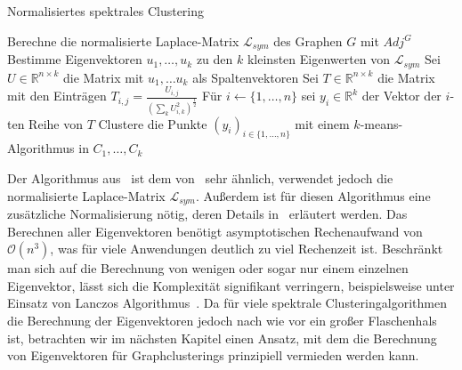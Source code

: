 \begin{algorithm}[H]
\label{algo:normalized-spectral-clustering-ng-jordan-weis}
\caption{Normalisiertes spektrales Clustering~\cite{NgJW01}}
	\DontPrintSemicolon
	
	\BlankLine
	
	Berechne die normalisierte Laplace-Matrix $\mathcal{L}_{sym}$ des Graphen $G$ mit $Adj^G$\;
	Bestimme Eigenvektoren $u_1, \dots, u_k$ zu den $k$ kleinsten Eigenwerten von $\mathcal{L}_{sym}$\;
	Sei $U \in \mathbb{R}^{n \times k}$ die Matrix mit $u_1, \dots u_k$ als Spaltenvektoren\;
	Sei $T \in \mathbb{R}^{n \times k}$ die Matrix mit den Einträgen
	$ T_{i,j} = \frac{U_{i,j}}{\left(\sum_k U_{i,k}^2\right)^{\frac{1}{2}}} $ \;
	Für $i \leftarrow \{ 1, \dots, n \}$ sei $y_i \in \mathbb{R}^k$ der Vektor der $i$-ten Reihe von $T$\;
	Clustere die Punkte $(y_i)_{i \in \{1, \dots, n\}}$ mit einem $k$-means-Algorithmus in $C_1, \dots, C_k$
\end{algorithm}
Der Algorithmus aus~\cite{NgJW01} ist dem von~\cite{ShiM00} sehr ähnlich, verwendet jedoch die normalisierte Laplace-Matrix
$\mathcal{L}_{sym}$. Außerdem ist für diesen Algorithmus eine zusätzliche Normalisierung nötig, deren Details in~\cite{Luxburg07}
erläutert werden.
\absatz
Das Berechnen aller Eigenvektoren benötigt asymptotischen Rechenaufwand von $\mathcal{O}(n^3)$, was für viele Anwendungen
deutlich zu viel Rechenzeit ist. Beschränkt man sich auf die Berechnung von wenigen oder sogar nur einem einzelnen Eigenvektor,
lässt sich die Komplexität signifikant verringern, beispielsweise unter Einsatz von Lanczos Algorithmus~\cite{Lanczos50}.
Da für viele spektrale Clusteringalgorithmen die Berechnung der Eigenvektoren jedoch nach wie vor ein großer Flaschenhals ist,
betrachten wir im nächsten Kapitel einen Ansatz, mit dem die Berechnung von Eigenvektoren für Graphclusterings prinzipiell
vermieden werden kann.